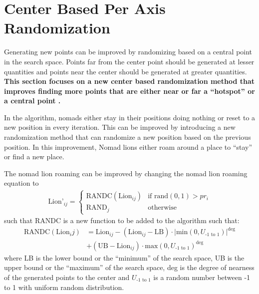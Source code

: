 \section{Center Based Per Axis Randomization}
\par Generating new points can be improved by randomizing based on a central point in the search space. Points far from the center point should be generated at lesser quantities and points near the center should be generated at greater quantities. \textbf{This section focuses on a new center based randomization method that improves finding more points that are either near or far a ``hotspot'' or a central point \cite{strategy}.}

\par In the algorithm, nomads either stay in their positions doing nothing or reset to a new position in every iteration. This can be improved by introducing a new randomization method that can randomize a new position based on the previous position. In this improvement, Nomad lions either roam around a place to ``stay'' or find a new place.

\par The nomad lion roaming can be improved by changing the nomad lion roaming equation to
\begin{align*}
 \text{Lion'}_{ij} =
  \begin{cases}
   \text{RANDC}(\text{Lion}_{ij})        & \text{if rand}(0,1)  > pr_i \\
   \text{RAND}_j        & \text{otherwise}
 \end{cases}
\end{align*}
such that RANDC is a new function to be added to the algorithm such that:
\begin{align*}
\text{RANDC}(\text{Lion}_ij) &= \text{Lion}_{ij} - (\text{Lion}_{ij} - \text{LB}) \cdot |\text{min}(0, U_\text{-1 to 1})|^\text{deg} \\
 & + (\text{UB} - \text{Lion}_{ij}) \cdot \text{max}(0, U_\text{-1 to 1})^{\text{deg}}
\end{align*}
where LB is the lower bound or the ``minimum'' of the search space, UB is the upper bound or the ``maximum'' of the search space, deg is the degree of nearness of the generated points to the center and $U_\text{-1 to 1}$ is a random number between -1 to 1 with uniform random distribution.

